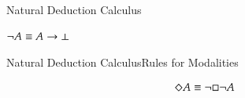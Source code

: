 \begin{frame}[shrink]{Natural Deduction Calculus}

\begin{unnamedCalculus}

\vspace{1em}

\s\s
{}
\s\s
{}
\s\s
{}

\vspace{2em}

\s\s
{}
\s\s
{}
\s\s
{}

\vspace{2em}

\s\s
{}
\s\s
{}
\s\s
{}

\vspace{2em}

\s
{}
\s
{}
\s\s
{}
\s
{}

\vspace{1em}

\s\s\s\s
$\neg A \equiv A \rightarrow \bot$ 
\s\s\s 
\alert{}

\vspace{1em}

\end{unnamedCalculus}

\end{frame}



\begin{frame}[shrink]{Natural Deduction Calculus}{Rules for Modalities}

\begin{unnamedCalculus}

\vspace{1em}

\s\s\s\s
{}
\s\s\s\s\s
{}

\vspace{2em}

\s\s\s\s
{}
\s\s\s\s\s
{}

\vspace{2em}

\alert{$$\Diamond A \equiv \neg \Box \neg A$$}

\vspace{1em}

\end{unnamedCalculus}

\end{frame}



